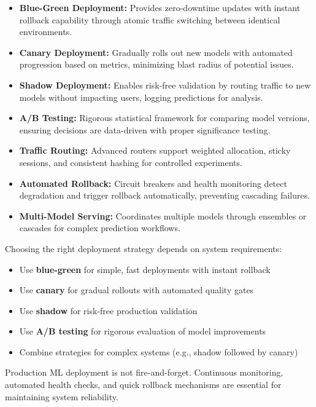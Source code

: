 \begin{itemize}
    \item \textbf{Blue-Green Deployment:} Provides zero-downtime updates with instant rollback capability through atomic traffic switching between identical environments.

    \item \textbf{Canary Deployment:} Gradually rolls out new models with automated progression based on metrics, minimizing blast radius of potential issues.

    \item \textbf{Shadow Deployment:} Enables risk-free validation by routing traffic to new models without impacting users, logging predictions for analysis.

    \item \textbf{A/B Testing:} Rigorous statistical framework for comparing model versions, ensuring decisions are data-driven with proper significance testing.

    \item \textbf{Traffic Routing:} Advanced routers support weighted allocation, sticky sessions, and consistent hashing for controlled experiments.

    \item \textbf{Automated Rollback:} Circuit breakers and health monitoring detect degradation and trigger rollback automatically, preventing cascading failures.

    \item \textbf{Multi-Model Serving:} Coordinates multiple models through ensembles or cascades for complex prediction workflows.
\end{itemize}

Choosing the right deployment strategy depends on system requirements:
\begin{itemize}
    \item Use \textbf{blue-green} for simple, fast deployments with instant rollback
    \item Use \textbf{canary} for gradual rollouts with automated quality gates
    \item Use \textbf{shadow} for risk-free production validation
    \item Use \textbf{A/B testing} for rigorous evaluation of model improvements
    \item Combine strategies for complex systems (e.g., shadow followed by canary)
\end{itemize}

Production ML deployment is not fire-and-forget. Continuous monitoring, automated health checks, and quick rollback mechanisms are essential for maintaining system reliability.

